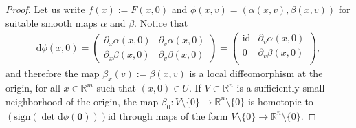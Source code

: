 \documentclass[reqno]{amsart}
\numberwithin{equation}{section}
\theoremstyle{personal}%
\theoremstyle{definition}
\newcommand{\R}{\mathds{R}}
\newcommand{\diff}{\mathrm{d}}
\begin{document}
\begin{proof}
Let us write $f(x):=F(x,0)$ and $\phi(x,v)=(\alpha(x,v),\beta(x,v))$ for suitable smooth maps $\alpha$ and $\beta$. Notice that
\begin{align*}
\diff\phi(x,0)
=
\left(
  \begin{array}{cc}
    \partial_x\alpha(x,0) & \partial_v\alpha(x,0) \\ 
    \partial_x\beta(x,0) & \partial_v\beta(x,0) 
  \end{array}
\right)
=
\left(
  \begin{array}{cc}
    \mathrm{id} & \partial_v\alpha(x,0) \\ 
    0 & \partial_v\beta(x,0) \\ 
  \end{array}
\right),
\end{align*}
and therefore the map $\beta_x(v):=\beta(x,v)$ is a local diffeomorphism at the origin, for all $x\in\R^m$ such that $(x,0)\in U$. If $V\subset\R^n$ is a sufficiently small neighborhood of the origin, the map $\beta_0:V\setminus\{0\}\to\R^n\setminus\{0\}$ is homotopic to $(\mathrm{sign}(\det\diff\phi(\bm0)))\mathrm{id}$ through maps of the form $V\setminus\{0\}\to\R^n\setminus\{0\}$.



\end{proof}
\end{document}
